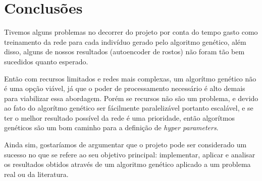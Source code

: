 \documentclass[twoside,conference,a4paper]{IEEEtran}
\begin{document}
\section{Conclusões}

Tivemos alguns problemas no decorrer do projeto por conta do tempo gasto como treinamento da rede para cada indivíduo gerado pelo algoritmo genético, além disso, alguns de nossos resultados (autoencoder de rostos) não foram tão bem sucedidos quanto esperado.

Então com recursos limitados e redes mais complexas, um algorítmo genético não é uma opção viável, já que o poder de processamento necessário é alto demais para viabilizar essa abordagem. Porém se recursos não são um problema, e devido ao fato do algorítmo genético ser fácilmente paralelizável portanto escalável, e se ter o melhor resultado possível da rede é uma prioridade, então algorítmos genéticos são um bom caminho para a definição de \emph{hyper parameters}. 

Ainda sim, gostaríamos de argumentar que o projeto pode ser considerado um sucesso no que se refere ao seu objetivo principal: implementar, aplicar e analisar os resultados obtidos através de um algoritmo genético aplicado a um problema real ou da literatura.




% 

% 


\end{document}
